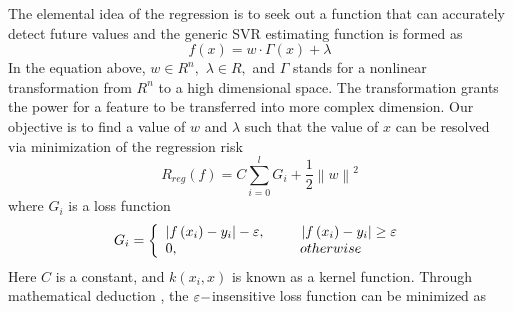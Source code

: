 The elemental idea of the regression is to seek out a function that can accurately detect future values and the generic SVR estimating function is formed as
\[
f\left( x \right) =  {w \cdot \Gamma \left( x \right)}  + \lambda
\label{eq:1}
\]
In the equation above, $w \in {R^n},$ $\lambda \in {R},$ and $\Gamma$ stands for a nonlinear transformation from $R^n$ to a high dimensional space. The transformation grants the power for a feature to be transferred into more complex dimension. Our objective is to find a value of $w$ and $\lambda$ such that the value of $x$ can be resolved via minimization of the regression risk
\[
{R_{reg}}\left( f \right) = C\sum\limits_{i = 0}^l {{G _i} + \frac{1}{2}{{\left\| w \right\|}^2}}
\label{eq:2}
\]
where ${G _i}$ is a loss function
\[{G _i} = \left\{ {\begin{array}{*{20}{l}}
{\left| {f\left( {{x_i}} \right) - {y_i}} \right| - \varepsilon ,{\kern 1pt} {\kern 1pt} {\kern 1pt} {\kern 1pt} {\kern 1pt} {\kern 1pt} {\kern 1pt} {\kern 1pt} {\kern 1pt} {\kern 1pt} {\kern 1pt} {\kern 1pt} {\kern 1pt} {\kern 1pt} {\kern 1pt} {\kern 1pt} {\kern 1pt} {\kern 1pt} {\kern 1pt} {\kern 1pt} {\kern 1pt} {\kern 1pt} {\kern 1pt} {\kern 1pt} \left| {f\left( {{x_i}} \right) - {y_i}} \right| \ge \varepsilon }\\
{0,{\kern 1pt} {\kern 1pt} {\kern 1pt} {\kern 1pt} {\kern 1pt} {\kern 1pt} {\kern 1pt} {\kern 1pt} {\kern 1pt} {\kern 1pt} {\kern 1pt} {\kern 1pt} {\kern 1pt} {\kern 1pt} {\kern 1pt} {\kern 1pt} {\kern 1pt} {\kern 1pt} {\kern 1pt} {\kern 1pt} {\kern 1pt} {\kern 1pt} {\kern 1pt} {\kern 1pt} {\kern 1pt} {\kern 1pt} {\kern 1pt} {\kern 1pt} {\kern 1pt} {\kern 1pt} {\kern 1pt} {\kern 1pt} {\kern 1pt} {\kern 1pt} {\kern 1pt} {\kern 1pt} {\kern 1pt} {\kern 1pt} {\kern 1pt} {\kern 1pt} {\kern 1pt} {\kern 1pt} {\kern 1pt} {\kern 1pt} {\kern 1pt} {\kern 1pt} {\kern 1pt} {\kern 1pt} {\kern 1pt} {\kern 1pt} {\kern 1pt} {\kern 1pt} {\kern 1pt} {\kern 1pt} {\kern 1pt} {\kern 1pt} {\kern 1pt} {\kern 1pt} {\kern 1pt} {\kern 1pt} {\kern 1pt} {\kern 1pt} {\kern 1pt} {\kern 1pt} {\kern 1pt} {\kern 1pt} {\kern 1pt} {\kern 1pt} {\kern 1pt} {\kern 1pt} {\kern 1pt} {\kern 1pt} {\kern 1pt} {\kern 1pt} {\kern 1pt} {\kern 1pt} {\kern 1pt} {\kern 1pt} {\kern 1pt} {\kern 1pt} {\kern 1pt} {\kern 1pt} {\kern 1pt} {\kern 1pt} {\kern 1pt} {\kern 1pt} {\kern 1pt} otherwise}
\end{array}} \right.\]
Here $C$ is a constant, and $k\left( {{x_i},x} \right)$ is known as a kernel function. Through mathematical deduction \cite{travel}, the $\varepsilon {\rm{ - }}$insensitive loss function can be minimized as
